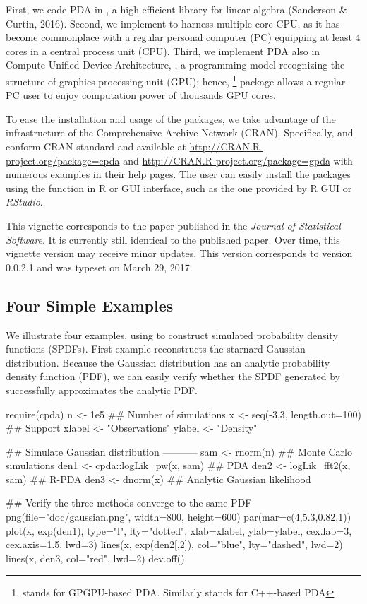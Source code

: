 \documentclass[shortnames,nojss,article]{jss}
\begin{document}
First, we code PDA in , a high efficient 
library for linear algebra (Sanderson \& Curtin, 2016). Second, we implement
 to harness multiple-core CPU, as it has become commonplace
with a regular personal computer (PC) equipping at least 4 cores in a central
process unit (CPU). Third, we implement PDA also in Compute Unified Device
Architecture, , a programming model recognizing the structure of
graphics processing unit (GPU); hence, \footnote{
stands for GPGPU-based PDA. Similarly  stands for C++-based PDA}
package allows a regular PC user to enjoy computation power of thousands GPU
cores.

To ease the installation and usage of the packages, we take advantage of the
infrastructure of the Comprehensive  Archive Network (CRAN).
Specifically,  and  conform CRAN standard and available at
\url{http://CRAN.R-project.org/package=cpda} and
\url{http://CRAN.R-project.org/package=gpda} with numerous examples in their
help pages. The user can easily install the packages using the
 function in R or GUI interface, such as the one
provided by R GUI or \textit{RStudio}.

\makeatletter
\if@nojss
  This vignette corresponds to the paper published in the \textsl{Journal of
    Statistical Software}. It is currently still identical to
  the published paper.  Over time, this vignette version may receive minor
  updates. This version corresponds to  version 0.0.2.1 and was
  typeset on March 29, 2017.
\fi
\makeatother


\subsection{Four Simple Examples}
We illustrate four examples, using  to construct
simulated probability density functions (SPDFs). First example reconstructs
the starnard Gaussian distribution. Because the Gaussian distribution has an
analytic probability density function (PDF), we can easily verify whether the
SPDF generated by  successfully approximates the analytic PDF.

%
\begin{Code}
require(cpda)
n      <- 1e5                        ## Number of simulations
x      <- seq(-3,3, length.out=100)  ## Support
xlabel <- "Observations"
ylabel <- "Density"

## Simulate Gaussian distribution -----------
sam  <- rnorm(n)                     ## Monte Carlo simulations
den1 <- cpda::logLik_pw(x, sam)      ## PDA
den2 <- logLik_fft2(x, sam)          ## R-PDA
den3 <- dnorm(x)                     ## Analytic Gaussian likelihood

## Verify the three methods converge to the same PDF
png(file="doc/gaussian.png", width=800, height=600)
par(mar=c(4,5.3,0.82,1))
plot(x, exp(den1), type="l", lty="dotted", xlab=xlabel, ylab=ylabel, cex.lab=3,
  cex.axis=1.5, lwd=3)
lines(x, exp(den2[,2]), col="blue", lty="dashed", lwd=2)
lines(x, den3, col="red", lwd=2)
dev.off()
\end{Code}
%
\end{document}
